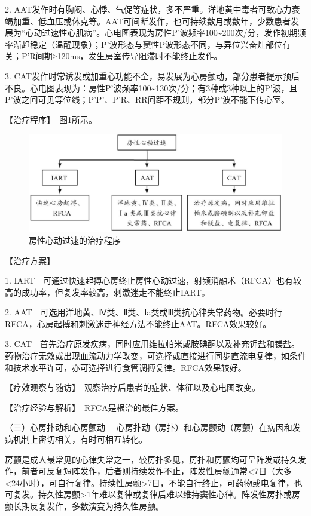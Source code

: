 2.
AAT发作时有胸闷、心悸、气促等症状，多不严重。洋地黄中毒者可致心力衰竭加重、低血压或休克等。AAT可间断发作，也可持续数月或数年，少数患者发展为“心动过速性心肌病”。心电图表现为房性P'波频率100\textasciitilde{}200次/分，发作初期频率渐趋稳定（温醒现象）；P'波形态与窦性P波形态不同，与异位兴奋灶部位有关；P'R间期≥120ms，发生房室传导阻滞时不能终止发作。

3.
CAT发作时常诱发或加重心功能不全，易发展为心房颤动，部分患者提示预后不良。心电图表现为：房性P'波频率100\textasciitilde{}130次/分；有3种或3种以上的P'波，且P'波之间可见等位线；P'P'、P'R、RR间距不规则，部分P'波不能下传心室。

【治疗程序】　图\ref{fig2-2-7}所示。

\begin{figure}[!htbp]
 \centering
 \includegraphics{./images/Image00052.jpg}
 \captionsetup{justification=centering}
 \caption{房性心动过速的治疗程序}
 \label{fig2-2-7}
  \end{figure} 

【治疗方案】

1.
IART　可通过快速起搏心房终止房性心动过速，射频消融术（RFCA）也有较高的成功率，但复发率较高，刺激迷走不能终止IART。

2.
AAT　可选用洋地黄、Ⅳ类、Ⅱ类、Ⅰa类或Ⅲ类抗心律失常药物。必要时行RFCA，心房起搏和刺激迷走神经方法不能终止AAT。RFCA效果较好。

3.
CAT　首先治疗原发疾病，同时应用维拉帕米或胺碘酮以及补充钾盐和镁盐。药物治疗无效或出现血流动力学改变，可选择或直接进行同步直流电复律，如条件和技术水平许可，亦可选择进行食管调搏复律。RFCA效果较好。

【疗效观察与随访】　观察治疗后患者的症状、体征以及心电图改变。

【治疗经验与解析】　RFCA是根治的最佳方案。

{（三）心房扑动和心房颤动}
　心房扑动（房扑）和心房颤动（房颤）在病因和发病机制上密切相关，有时可相互转化。

房颤是成人最常见的心律失常之一，较房扑多见，房扑和房颤均可呈阵发或持久发作，前者可反复短阵发作，后者则持续发作不止，阵发性房颤通常\textless{}7日（大多\textless{}24小时），可自行复律。持续性房颤\textgreater{}7日，不能自行终止，可药物或电复律，也可复发。持久性房颤\textgreater{}1年难以复律或复律后难以维持窦性心律。阵发性房扑或房颤长期反复发作，多数演变为持久性房颤。

